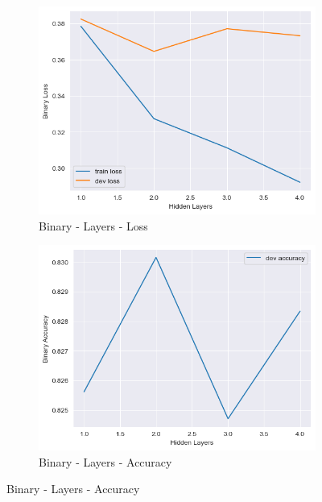 \documentclass[12pt]{article}
\theoremstyle{definitionstyle}
\begin{document}
\begin{enumerate}
\begin{figure}[H]
            \begin{subfigure}{0.35\textwidth}
                \includegraphics[width=\textwidth]{images/binary_layers_loss.png}
                \caption{Binary - Layers - Loss}
            \end{subfigure}
            \hfill
            \begin{subfigure}{0.35\textwidth}
                \includegraphics[width=\textwidth]{images/binary_layers_acc.png}
                \caption{Binary - Layers - Accuracy}
            \end{subfigure}
        

\end{figure}
\end{enumerate}
\end{document}
